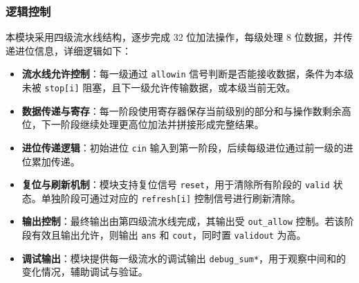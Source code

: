 \subsubsection{逻辑控制}

本模块采用四级流水线结构，逐步完成 32 位加法操作，每级处理 8 位数据，并传递进位信息，详细逻辑如下：

\begin{itemize}
    \item \textbf{流水线允许控制}：每一级通过 \texttt{allowin} 信号判断是否能接收数据，条件为本级未被 \texttt{stop[i]} 阻塞，且下一级允许传输数据，或本级当前无效。
    
    \item \textbf{数据传递与寄存}：每一阶段使用寄存器保存当前级别的部分和与操作数剩余高位，下一阶段继续处理更高位加法并拼接形成完整结果。
    
    \item \textbf{进位传递逻辑}：初始进位 \texttt{cin} 输入到第一阶段，后续每级进位通过前一级的进位累加传递。
    
    \item \textbf{复位与刷新机制}：模块支持复位信号 \texttt{reset}，用于清除所有阶段的 \texttt{valid} 状态。单独阶段可通过对应的 \texttt{refresh[i]} 控制信号进行刷新清除。
    
    \item \textbf{输出控制}：最终输出由第四级流水线完成，其输出受 \texttt{out\_allow} 控制。若该阶段有效且输出允许，则输出 \texttt{ans} 和 \texttt{cout}，同时置 \texttt{validout} 为高。
    
    \item \textbf{调试输出}：模块提供每一级流水的调试输出 \texttt{debug\_sum*}，用于观察中间和的变化情况，辅助调试与验证。
\end{itemize}
